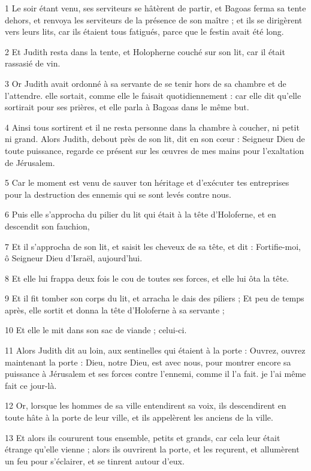 \par 1 Le soir étant venu, ses serviteurs se hâtèrent de partir, et Bagoas ferma sa tente dehors, et renvoya les serviteurs de la présence de son maître ; et ils se dirigèrent vers leurs lits, car ils étaient tous fatigués, parce que le festin avait été long.
\par 2 Et Judith resta dans la tente, et Holopherne couché sur son lit, car il était rassasié de vin.
\par 3 Or Judith avait ordonné à sa servante de se tenir hors de sa chambre et de l'attendre. elle sortait, comme elle le faisait quotidiennement : car elle dit qu'elle sortirait pour ses prières, et elle parla à Bagoas dans le même but.
\par 4 Ainsi tous sortirent et il ne resta personne dans la chambre à coucher, ni petit ni grand. Alors Judith, debout près de son lit, dit en son cœur : Seigneur Dieu de toute puissance, regarde ce présent sur les œuvres de mes mains pour l'exaltation de Jérusalem.
\par 5 Car le moment est venu de sauver ton héritage et d'exécuter tes entreprises pour la destruction des ennemis qui se sont levés contre nous.
\par 6 Puis elle s'approcha du pilier du lit qui était à la tête d'Holoferne, et en descendit son fauchion,
\par 7 Et il s'approcha de son lit, et saisit les cheveux de sa tête, et dit : Fortifie-moi, ô Seigneur Dieu d'Israël, aujourd'hui.
\par 8 Et elle lui frappa deux fois le cou de toutes ses forces, et elle lui ôta la tête.
\par 9 Et il fit tomber son corps du lit, et arracha le dais des piliers ; Et peu de temps après, elle sortit et donna la tête d'Holoferne à sa servante ;
\par 10 Et elle le mit dans son sac de viande ; celui-ci.
\par 11 Alors Judith dit au loin, aux sentinelles qui étaient à la porte : Ouvrez, ouvrez maintenant la porte : Dieu, notre Dieu, est avec nous, pour montrer encore sa puissance à Jérusalem et ses forces contre l'ennemi, comme il l'a fait. je l'ai même fait ce jour-là.
\par 12 Or, lorsque les hommes de sa ville entendirent sa voix, ils descendirent en toute hâte à la porte de leur ville, et ils appelèrent les anciens de la ville.
\par 13 Et alors ils coururent tous ensemble, petits et grands, car cela leur était étrange qu'elle vienne ; alors ils ouvrirent la porte, et les reçurent, et allumèrent un feu pour s'éclairer, et se tinrent autour d'eux.

